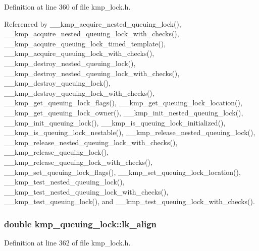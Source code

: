 Definition at line 360 of file kmp\-\_\-lock.\-h.



Referenced by \-\_\-\-\_\-kmp\-\_\-acquire\-\_\-nested\-\_\-queuing\-\_\-lock(), \-\_\-\-\_\-kmp\-\_\-acquire\-\_\-nested\-\_\-queuing\-\_\-lock\-\_\-with\-\_\-checks(), \-\_\-\-\_\-kmp\-\_\-acquire\-\_\-queuing\-\_\-lock\-\_\-timed\-\_\-template(), \-\_\-\-\_\-kmp\-\_\-acquire\-\_\-queuing\-\_\-lock\-\_\-with\-\_\-checks(), \-\_\-\-\_\-kmp\-\_\-destroy\-\_\-nested\-\_\-queuing\-\_\-lock(), \-\_\-\-\_\-kmp\-\_\-destroy\-\_\-nested\-\_\-queuing\-\_\-lock\-\_\-with\-\_\-checks(), \-\_\-\-\_\-kmp\-\_\-destroy\-\_\-queuing\-\_\-lock(), \-\_\-\-\_\-kmp\-\_\-destroy\-\_\-queuing\-\_\-lock\-\_\-with\-\_\-checks(), \-\_\-\-\_\-kmp\-\_\-get\-\_\-queuing\-\_\-lock\-\_\-flags(), \-\_\-\-\_\-kmp\-\_\-get\-\_\-queuing\-\_\-lock\-\_\-location(), \-\_\-\-\_\-kmp\-\_\-get\-\_\-queuing\-\_\-lock\-\_\-owner(), \-\_\-\-\_\-kmp\-\_\-init\-\_\-nested\-\_\-queuing\-\_\-lock(), \-\_\-\-\_\-kmp\-\_\-init\-\_\-queuing\-\_\-lock(), \-\_\-\-\_\-kmp\-\_\-is\-\_\-queuing\-\_\-lock\-\_\-initialized(), \-\_\-\-\_\-kmp\-\_\-is\-\_\-queuing\-\_\-lock\-\_\-nestable(), \-\_\-\-\_\-kmp\-\_\-release\-\_\-nested\-\_\-queuing\-\_\-lock(), \-\_\-\-\_\-kmp\-\_\-release\-\_\-nested\-\_\-queuing\-\_\-lock\-\_\-with\-\_\-checks(), \-\_\-\-\_\-kmp\-\_\-release\-\_\-queuing\-\_\-lock(), \-\_\-\-\_\-kmp\-\_\-release\-\_\-queuing\-\_\-lock\-\_\-with\-\_\-checks(), \-\_\-\-\_\-kmp\-\_\-set\-\_\-queuing\-\_\-lock\-\_\-flags(), \-\_\-\-\_\-kmp\-\_\-set\-\_\-queuing\-\_\-lock\-\_\-location(), \-\_\-\-\_\-kmp\-\_\-test\-\_\-nested\-\_\-queuing\-\_\-lock(), \-\_\-\-\_\-kmp\-\_\-test\-\_\-nested\-\_\-queuing\-\_\-lock\-\_\-with\-\_\-checks(), \-\_\-\-\_\-kmp\-\_\-test\-\_\-queuing\-\_\-lock(), and \-\_\-\-\_\-kmp\-\_\-test\-\_\-queuing\-\_\-lock\-\_\-with\-\_\-checks().

\hypertarget{unionkmp__queuing__lock_aafd587a09109cb5222af369fb68a0c01}{
\subsubsection[{lk\-\_\-align}]{\setlength{\rightskip}{0pt plus 5cm}double kmp\-\_\-queuing\-\_\-lock\-::lk\-\_\-align}}\label{unionkmp__queuing__lock_aafd587a09109cb5222af369fb68a0c01}


Definition at line 362 of file kmp\-\_\-lock.\-h.

